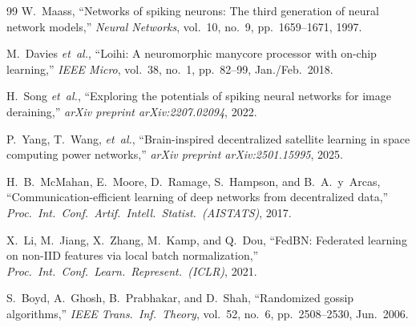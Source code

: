 \documentclass[conference]{IEEEtran}
\begin{document}
\begin{thebibliography}{99}
W.~Maass,
``Networks of spiking neurons: The third generation of neural network
models,''
\emph{Neural Networks}, vol.~10, no.~9, pp.~1659--1671, 1997.

M.~Davies \emph{et~al.},
``Loihi: A neuromorphic manycore processor with on-chip learning,''
\emph{IEEE Micro}, vol.~38, no.~1, pp.~82--99, Jan./Feb.\ 2018.

H.~Song \emph{et~al.},
``Exploring the potentials of spiking neural networks for image
deraining,''
\emph{arXiv preprint arXiv:2207.02094}, 2022.

P.~Yang, T.~Wang, \emph{et~al.},
``Brain-inspired decentralized satellite learning in space computing
power networks,''
\emph{arXiv preprint arXiv:2501.15995}, 2025.

H.~B.~McMahan, E.~Moore, D.~Ramage, S.~Hampson, and B.~A.~y~Arcas,
``Communication-efficient learning of deep networks from decentralized
data,''
\emph{Proc.\ Int.\ Conf.\ Artif.\ Intell.\ Statist.\ (AISTATS)}, 2017.

X.~Li, M.~Jiang, X.~Zhang, M.~Kamp, and Q.~Dou,
``FedBN: Federated learning on non-IID features via local batch
normalization,''
\emph{Proc.\ Int.\ Conf.\ Learn.\ Represent.\ (ICLR)}, 2021.

S.~Boyd, A.~Ghosh, B.~Prabhakar, and D.~Shah,
``Randomized gossip algorithms,''
\emph{IEEE Trans.\ Inf.\ Theory}, vol.~52, no.~6, pp.~2508--2530,
Jun.\ 2006.


\end{thebibliography}
\end{document}
